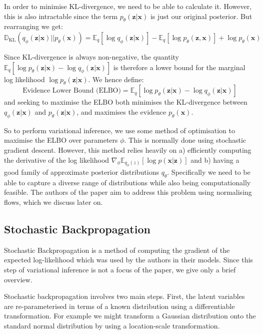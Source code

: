 In order to minimise KL-divergence, we need to be able to calculate it. However, this is also intractable since the term $p_\theta(\mathbf{z|x})$ is just our original posterior. But rearranging we get:
\begin{equation}
	\mathbb{D}_{\text{KL}}(q_\phi(\mathbf{z|x})||p_\theta(\mathbf{x})) = \mathbb{E}_q[\log q_\phi(\mathbf{z|x})] - \mathbb{E}_q[\log p_\theta(\mathbf{z,x})] + \log p_\theta(\mathbf{x})
\end{equation}

Since KL-divergence is always non-negative, the quantity $ \mathbb{E}_q[\log p_\theta(\mathbf{z|x}) - \log q_\phi(\mathbf{z|x})] $ is therefore a lower bound for the marginal log likelihood $ \log p_\theta(\mathbf{z|x})$. We hence define:
 \begin{equation}
 	\text{Evidence Lower Bound (ELBO)} = \mathbb{E}_q[\log p_\theta(\mathbf{z|x}) - \log q_\phi(\mathbf{z|x})]
 \end{equation}  
 and seeking to maximise the ELBO both minimises the KL-divergence between $q_\phi(\mathbf{z|x})$ and $p_\theta(\mathbf{z|x})$, and maximises the evidence $p_\theta(\mathbf{x})$.

So to perform variational inference, we use some method of optimisation to maximise the ELBO over parameters $\phi$. This is normally done using stochastic gradient descent. However, this method relies heavily on a) efficiently computing the derivative of the log likelihood $ \nabla_\phi\mathbb{E}_{q_\phi(z)}[\log p(\mathbf{x|z})] $ and b) having a good family of approximate posterior distributions $q_\theta$. Specifically we need to be able to capture a diverse range of distributions while also being computationally feasible. The authors of the paper aim to address this problem using normalising flows, which we discuss later on.

\subsection{Stochastic Backpropagation}

Stochastic Backpropagation is a method of computing the gradient of the expected log-likelihood which was used by the authors in their models. Since this step of variational inference is not a focus of the paper, we give only a brief overview.

Stochastic backpropagation involves two main steps. First, the latent variables are re-parameterised in terms of a known distribution using a differentiable transformation. For example we might transform a Gaussian distribution onto the standard normal distribution by using a location-scale transformation. 

